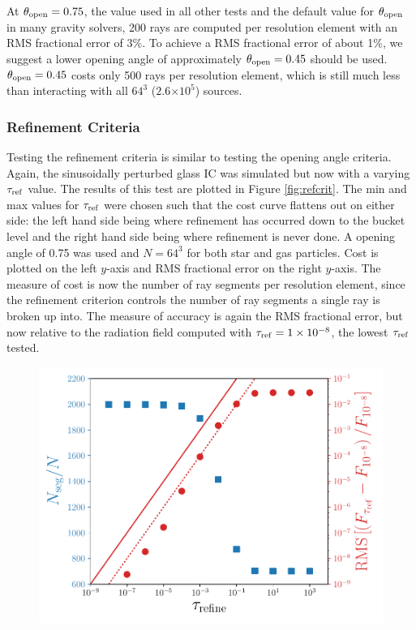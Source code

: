 \documentclass[fleq,usenatbib]{mnras}
\providecommand{\e}[1]{\ensuremath{\times10^{#1}}}
\newcommand{\tr}{\tau_{\rm ref}}
\newcommand{\tO}{\theta_{\rm open}}
\begin{document}
{At $\tO=0.75$, the value used in all other tests and the 
default value for $\tO$ in many gravity solvers, 200 rays are 
computed per resolution element with an RMS fractional error of 3\%. To 
achieve a RMS fractional error of about 1\%, we suggest a lower opening angle 
of approximately $\tO=0.45$ should be used. $\tO=0.45$ costs only 500 rays per 
resolution element, which is still much less than interacting with all $64^3$ 
($2.6\e{5}$) sources.

\subsubsection{Refinement Criteria}
Testing the refinement criteria is similar to testing the opening angle 
criteria. Again, the sinusoidally perturbed glass IC was simulated but now 
with a varying $\tr$ value. The results of this test are plotted in Figure 
\ref{fig:refcrit}. The min and max values for $\tr$ were chosen such that the 
cost curve flattens out on either side: the left hand side being where 
refinement has occurred down to the bucket level and the right hand side 
being where refinement is never done. A opening angle of 0.75 was used and 
$N=64^3$ for both star and gas particles. Cost is plotted on the left $y$-axis 
and RMS fractional error on the right $y$-axis. The measure of cost is now 
the number of ray segments per resolution element, since the refinement 
criterion controls the number of ray segments a single ray is broken up into. 
The measure of accuracy is again the RMS fractional error, but now relative to 
the radiation field computed with $\tr=1\e{-8}$, the lowest $\tr$ tested.
\begin{figure}
\includegraphics[width=1\linewidth]{Figures/refinement_criteria.pdf}

\end{figure}}
\end{document}
